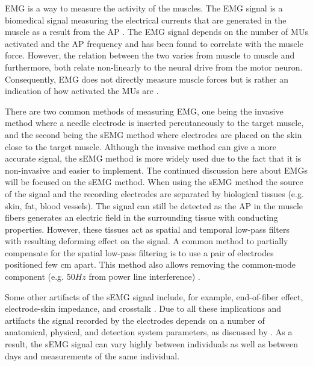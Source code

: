 \documentclass[../main.tex]{subfiles}
\begin{document}
\Ac{EMG} is a way to measure the activity of the muscles.
The \ac{EMG} signal is a biomedical signal measuring the electrical currents that are generated in the muscle as a result from the \ac{AP} \cite{Raez2006}.
The \ac{EMG} signal depends on the number of \acp{MU} activated and the \ac{AP} frequency and has been found to correlate with the muscle force.
However, the relation between the two varies from muscle to muscle and furthermore, both relate non-linearly to the neural drive from the motor neuron.
Consequently, \ac{EMG} does not directly measure muscle forces but is rather an indication of how activated the \acp{MU} are \cite{Enoka2016, Farina2016}.

There are two common methods of measuring \ac{EMG}, one being the invasive method where a needle electrode is inserted percutaneously to the target muscle, and the second being the \ac{sEMG} method where electrodes are placed on the skin close to the target muscle. 
Although the invasive method can give a more accurate signal, the \ac{sEMG} method is more widely used due to the fact that it is non-invasive and easier to implement. 
The continued discussion here about \ac{EMG}s will be focused on the \ac{sEMG} method.
When using the \ac{sEMG} method the source of the signal and the recording electrodes are separated by biological tissues (e.g. skin, fat, blood vessels).
The signal can still be detected as the \ac{AP} in the muscle fibers generates an electric field in the surrounding tissue with conducting properties.
However, these tissues act as spatial and temporal low-pass filters with resulting deforming effect on the signal.
A common method to partially compensate for the spatial low-pass filtering is to use a pair of electrodes positioned few cm apart.
This method also allows removing the common-mode component (e.g. $50Hz$ from power line interference) \cite{Farina2016}.

Some other artifacts of the \ac{sEMG} signal include, for example, end-of-fiber effect, electrode-skin impedance, and crosstalk \cite{Farina2016}.
Due to all these implications and artifacts the signal recorded by the electrodes depends on a number of anatomical, physical, and detection system parameters, as discussed by \textcite[p. 41]{Farina2016}. 
As a result, the \ac{sEMG} signal can vary highly between individuals as well as between days and measurements of the same individual.
\end{document}
